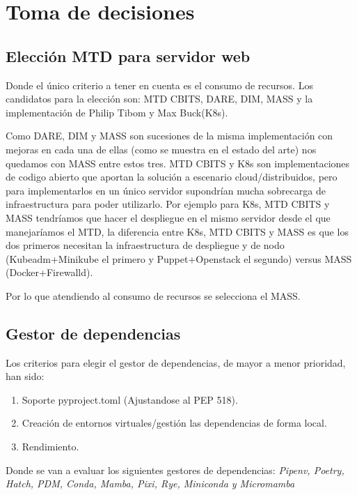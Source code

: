 \section{Toma de decisiones}

\subsection{Elección MTD para servidor web}
Donde el único criterio a tener en cuenta es el consumo de recursos.
Los candidatos para la elección son: MTD CBITS, DARE, DIM, MASS y la implementación de Philip Tibom y Max Buck\cite{MTD-gotemburgo}(K8s).

Como DARE, DIM y MASS son sucesiones de la misma implementación con mejoras en cada una de ellas (como se muestra en el estado del arte) nos quedamos con MASS entre estos tres.
MTD CBITS y K8s son implementaciones de codigo abierto que aportan la solución a escenario cloud/distribuidos, pero para implementarlos en un único servidor supondrían mucha sobrecarga de infraestructura para poder utilizarlo. Por ejemplo para K8s, MTD CBITS y MASS tendríamos que hacer el despliegue en el mismo servidor desde el que manejaríamos el MTD, la diferencia entre K8s, MTD CBITS y MASS es que los dos primeros necesitan la infraestructura de despliegue y de nodo (Kubeadm+Minikube el primero y Puppet+Openstack el segundo) versus MASS (Docker+Firewalld). 

Por lo que atendiendo al consumo de recursos se selecciona el MASS.

\subsection{Gestor de dependencias}
Los criterios para elegir el gestor de dependencias, de mayor a menor prioridad, han sido:
\begin{enumerate}
    \item Soporte pyproject.toml (Ajustandose al PEP 518\cite{pep-pyproject}).
    \item Creación de entornos virtuales/gestión las dependencias de forma local.
    \item Rendimiento.
\end{enumerate}

Donde se van a evaluar los siguientes gestores de dependencias: \textit{Pipenv, Poetry, Hatch, PDM, Conda, Mamba, Pixi, Rye, Miniconda y Micromamba}

